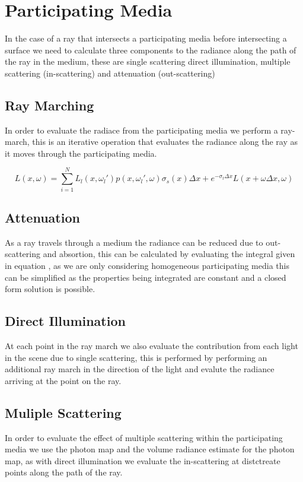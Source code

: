 \section{Participating Media}
In the case of a ray that intersects a participating media before intersecting a surface we need to calculate three components to
the radiance along the path of the ray in the medium, these are single scattering direct illumination, multiple scattering (in-scattering)
and attenuation (out-scattering)

\subsection{Ray Marching}
In order to evaluate the radiace from the participating media we perform a ray-march, this is an iterative operation that evaluates the
radiance along the ray as it moves through the participating media.

\begin{equation}
L(x, \omega) = \sum\limits_{i = 1}^N L_l(x, \omega_l')p(x, \omega_l', \omega)\sigma_s(x)\Delta x + e^{- \sigma_t \Delta x} L (x + \omega \Delta x, \omega)
\end{equation}

\subsection{Attenuation}
As a ray travels through a medium the radiance can be reduced due to out-scattering and absortion, this can be calculated by evaluating
the integral given in equation , as we are only considering homogeneous participating media this can be
simplified as the properties being integrated are constant and a closed form solution is possible.


\subsection{Direct Illumination}
At each point in the ray march we also evaluate the contribution from each light in the scene due to single scattering, this is performed
by performing an additional ray march in the direction of the light and evalute the radiance arriving at the point on the ray.

\subsection{Muliple Scattering}
In order to evaluate the effect of multiple scattering within the participating media we use the photon map and the volume radiance estimate
for the photon map, as with direct illumination we evaluate the in-scattering at distctreate points along the path of the ray.

